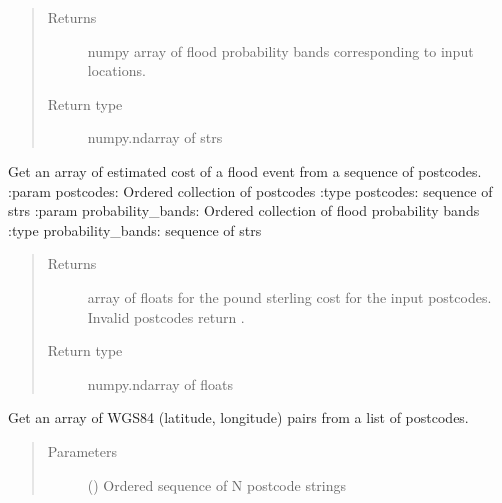 \documentclass[letterpaper,10pt,english]{sphinxmanual}
\begin{document}
\begin{fulllineitems}
\begin{fulllineitems}
\begin{quote}
\begin{description}
\item[{Returns}] \leavevmode
numpy array of flood probability bands corresponding to input locations.

\item[{Return type}] \leavevmode
numpy.ndarray of strs

\end{description}\end{quote}

\end{fulllineitems}


\begin{fulllineitems}
\label{\detokenize{index:flood_tool.Tool.get_flood_cost}}
Get an array of estimated cost of a flood event from a sequence of postcodes.
:param postcodes: Ordered collection of postcodes
:type postcodes: sequence of strs
:param probability\_bands: Ordered collection of flood probability bands
:type probability\_bands: sequence of strs
\begin{quote}\begin{description}
\item[{Returns}] \leavevmode
array of floats for the pound sterling cost for the input postcodes.
Invalid postcodes return .

\item[{Return type}] \leavevmode
numpy.ndarray of floats

\end{description}\end{quote}

\end{fulllineitems}


\begin{fulllineitems}
\label{\detokenize{index:flood_tool.Tool.get_lat_long}}
Get an array of WGS84 (latitude, longitude) pairs from a list of postcodes.
\begin{quote}\begin{description}
\item[{Parameters}] \leavevmode
{} () \textendash{} Ordered sequence of N postcode strings


\end{description}
\end{quote}
\end{fulllineitems}
\end{fulllineitems}
\end{document}
